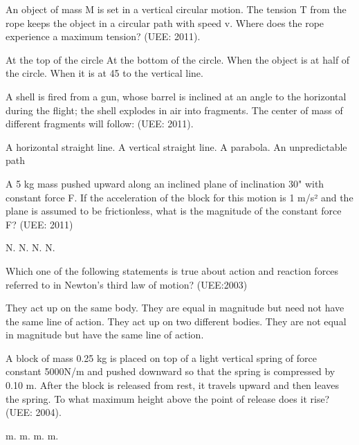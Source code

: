 \documentclass[12pt,addpoints]{exam}
\begin{document}
\begin{questions}
					\question An object of mass M is set in a vertical circular motion. The tension T from the rope keeps the object in a circular path with speed v. Where does the rope experience a maximum tension? (UEE: 2011). \\
					\begin{oneparchoices}
						\choice At the top of the circle
						\choice At the bottom of the circle.
						\choice When the object is at half of the circle.
						\choice When it is at 45 to the vertical line.
				
					\end{oneparchoices}
				
					\question A shell is fired from a gun, whose barrel is inclined at an angle to the horizontal during the flight; the shell explodes in air into fragments. The center of mass of different fragments will follow: (UEE: 2011).\\
					\begin{choices}
						\choice A horizontal straight line.
						\choice  A vertical straight line.
						\choice A parabola.
						\choice An unpredictable path
						
					\end{choices}
					
					\question  A 5 kg mass pushed upward along an inclined plane of inclination 30" with constant force F. If the acceleration of the block for this motion is 1 m/s² and the plane is assumed to be frictionless, what is the magnitude of the constant force F? (UEE: 2011) \\
					\begin{oneparchoices}
						\choice  5 N.
						\choice  25 N.
						\choice  20 N.
						\choice  30 N.
						
					\end{oneparchoices} 

					\question Which one of the following statements is true about action and reaction forces referred to in Newton's third law of motion? (UEE:2003) \\
					\begin{oneparchoices}
						\choice They act up on the same body.
						\choice They are equal in magnitude but need not have the same line of action.
						\choice They act up on two different bodies.
						\choice They are not equal in magnitude but have the same line of action.
						
					\end{oneparchoices}

					\question  A block of mass 0.25 kg is placed on top of a light vertical spring of force constant 5000N/m and pushed downward so that the spring is compressed by 0.10 m. After the block is released from rest, it travels upward and then leaves the spring. To what maximum height above the point of release does it rise? (UEE: 2004).\\
					\begin{oneparchoices}
						\choice 10.2 m.
						\choice 9.2 m.
						\choice 8.0 m.
						\choice 9.0 m.
					\end{oneparchoices}


\end{questions}
\end{document}
